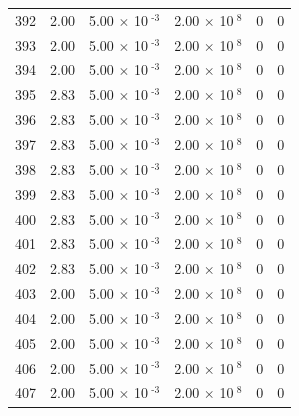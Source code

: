 \documentclass[a4paper,11pt]{article}
\begin{document}
\begin{center}
\begin{longtable}{|R{1.5cm}|R{2.4cm}|R{2.4cm}|R{2.4cm}|R{2.4cm}|R{2.4cm}|}
  392 &   2.00  &         5.00 $\times$ 10$^{\text{          -3}}$  &         2.00 $\times$ 10$^{\text{           8}}$  & 0  & 0 \\
  393 &   2.00  &         5.00 $\times$ 10$^{\text{          -3}}$  &         2.00 $\times$ 10$^{\text{           8}}$  & 0  & 0 \\
  394 &   2.00  &         5.00 $\times$ 10$^{\text{          -3}}$  &         2.00 $\times$ 10$^{\text{           8}}$  & 0  & 0 \\
  395 &   2.83  &         5.00 $\times$ 10$^{\text{          -3}}$  &         2.00 $\times$ 10$^{\text{           8}}$  & 0  & 0 \\
  396 &   2.83  &         5.00 $\times$ 10$^{\text{          -3}}$  &         2.00 $\times$ 10$^{\text{           8}}$  & 0  & 0 \\
  397 &   2.83  &         5.00 $\times$ 10$^{\text{          -3}}$  &         2.00 $\times$ 10$^{\text{           8}}$  & 0  & 0 \\
  398 &   2.83  &         5.00 $\times$ 10$^{\text{          -3}}$  &         2.00 $\times$ 10$^{\text{           8}}$  & 0  & 0 \\
  399 &   2.83  &         5.00 $\times$ 10$^{\text{          -3}}$  &         2.00 $\times$ 10$^{\text{           8}}$  & 0  & 0 \\
  400 &   2.83  &         5.00 $\times$ 10$^{\text{          -3}}$  &         2.00 $\times$ 10$^{\text{           8}}$  & 0  & 0 \\
  401 &   2.83  &         5.00 $\times$ 10$^{\text{          -3}}$  &         2.00 $\times$ 10$^{\text{           8}}$  & 0  & 0 \\
  402 &   2.83  &         5.00 $\times$ 10$^{\text{          -3}}$  &         2.00 $\times$ 10$^{\text{           8}}$  & 0  & 0 \\
  403 &   2.00  &         5.00 $\times$ 10$^{\text{          -3}}$  &         2.00 $\times$ 10$^{\text{           8}}$  & 0  & 0 \\
  404 &   2.00  &         5.00 $\times$ 10$^{\text{          -3}}$  &         2.00 $\times$ 10$^{\text{           8}}$  & 0  & 0 \\
  405 &   2.00  &         5.00 $\times$ 10$^{\text{          -3}}$  &         2.00 $\times$ 10$^{\text{           8}}$  & 0  & 0 \\
  406 &   2.00  &         5.00 $\times$ 10$^{\text{          -3}}$  &         2.00 $\times$ 10$^{\text{           8}}$  & 0  & 0 \\
  407 &   2.00  &         5.00 $\times$ 10$^{\text{          -3}}$  &         2.00 $\times$ 10$^{\text{           8}}$  & 0  & 0 \\

\end{longtable}
\end{center}
\end{document}
